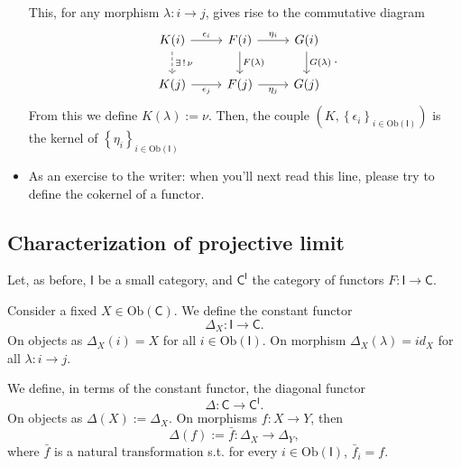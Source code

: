 \begin{prop}
\begin{itemize}
			This, for any morphism $\lambda: i \to j$, gives rise to the commutative diagram
			\begin{equation}
			\begin{tikzcd}
				K(i) \arrow[d, "\exists\, !\, \nu", dashrightarrow] \arrow[r, "\epsilon_i", rightarrow] &
				F(i) \arrow[r, "\eta_i", rightarrow] \arrow[d, "F(\lambda)", rightarrow] &
				G(i) \arrow[d, "G(\lambda)", rightarrow] \\
				K(j) \arrow[r, "\epsilon_j"', rightarrow] &
				F(j) \arrow[r, "\eta_j"', rightarrow] &
				G(j)
			\end{tikzcd}
			.\end{equation} 
			From this we define $K(\lambda) := \nu$.
			Then, the couple $\left(K, \left\{ \epsilon_i \right\}_{i \in \mathrm{Ob} \left(\mathsf{I}\right)} \right)$
			is the kernel of $\left\{ \eta_i \right\}_{i \in \mathrm{Ob} \left(\mathsf{I}\right)} $
		\item As an exercise to the writer: when you'll next read this line, please try to define the cokernel of a functor.
	\end{itemize}
\end{prop} 

\subsection{Characterization of projective limit}
Let, as before, $\mathsf{I}$ be a small category, and $\mathsf{C}^{\mathsf{I}}$ the category of functors $F: \mathsf{I} \to \mathsf{C}$.

\begin{defn}
	Consider a fixed $X \in \mathrm{Ob} \left(\mathsf{C}\right)$.
	We define the constant functor
	\begin{equation}
	\Delta_X: \mathsf{I} \to \mathsf{C}
	.\end{equation} 
	On objects as $\Delta_X(i) = X$ for all $i \in \mathrm{Ob} \left(\mathsf{I}\right)$.
	On morphism $\Delta_X(\lambda) = id_X$ for all $\lambda: i \to j$.
\end{defn}

\begin{defn}
	We define, in terms of the constant functor, the diagonal functor
	 \begin{equation}
	\Delta: \mathsf{C} \to \mathsf{C}^{\mathsf{I}}
	.\end{equation} 
	On objects as $\Delta(X) := \Delta_X$.
	On morphisms $f: X \to Y$, then
	\begin{equation}
		\Delta(f) := \bar{f}: \Delta_X \to \Delta_Y
	,\end{equation} 
	where $\bar{f}$ is a natural transformation s.t. for every $i \in \mathrm{Ob} \left(\mathsf{I}\right)$, $\bar{f}_i = f$.
\end{defn}

